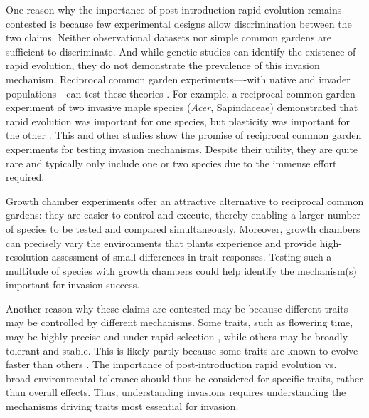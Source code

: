 \documentclass[12pt]{article}\usepackage[]{graphicx}\usepackage[]{color}
\begin{document}
	
	One reason why the importance of post-introduction rapid evolution remains contested is because few experimental designs allow discrimination between the two claims. Neither observational datasets \parencite[e.g.,][]{Wolkovich2013} nor simple common gardens \parencite[i.e., testing individuals from only one part of the range or in only one site][]{Conner2004,Vitasse2009} are sufficient to discriminate. And while genetic studies can identify the existence of rapid evolution, they do not demonstrate the prevalence of this invasion mechanism. Reciprocal common garden experiments----with native and invader populations---can test these theories \parencite[e.g.,][]{Williams2008}. For example, a reciprocal common garden experiment of two invasive maple species (\textit{Acer}, Sapindaceae) demonstrated that rapid evolution was important for one species, but plasticity was important for the other \parencite{Lamarque2015}.  This and other studies show the promise of reciprocal common garden experiments for testing invasion mechanisms. Despite their utility, they are quite rare and typically only include one or two species due to the immense effort required. 
	
	Growth chamber experiments offer an attractive alternative to reciprocal common gardens: they are easier to control and execute, thereby enabling a larger number of species to be tested and compared simultaneously. Moreover, growth chambers can precisely vary the environments that plants experience and provide high-resolution assessment of small differences in trait responses. Testing such a multitude of species with growth chambers could help identify the mechanism(s) important for invasion success.  
	
	Another reason why these claims are contested may be because different traits may be controlled by different mechanisms. Some traits, such as flowering time, may be highly precise and under rapid selection \parencite{Weber1998}, while others may be broadly tolerant and stable. This is likely partly because some traits are known to evolve faster than others \parencite{Weiss-Lehman2017}. The importance of post-introduction rapid evolution vs. broad environmental tolerance should thus be considered for specific traits, rather than overall effects. Thus,  understanding invasions requires understanding the mechanisms driving traits most essential for invasion.
	
\end{document}
